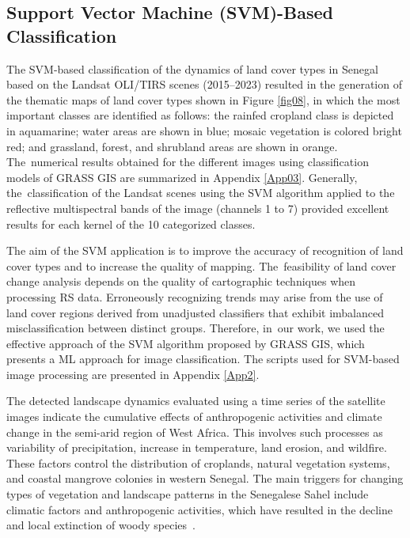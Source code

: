 \documentclass[earth,article,accept,pdftex,moreauthors]{Definitions/mdpi}
\begin{document}
{\subsection{{Support Vector Machine (SVM)-Based Classification}}

{The {SVM-based} classification of the dynamics of land cover types in Senegal based on the Landsat OLI/TIRS scenes (2015--2023) resulted in the generation of the thematic maps of land cover types  shown in Figure} \ref{fig08}, {in which the most important classes are identified as follows: the {rainfed} cropland class is depicted in aquamarine; water areas are shown in blue; mosaic vegetation is colored bright red; and grassland, forest, and shrubland areas are shown in orange. The~numerical results obtained for the different images using classification models of GRASS GIS are summarized in Appendix \ref{App03}. %
 Generally, the~classification of the Landsat {scenes} using{ }the SVM algorithm {applied to} the reflective multispectral bands of the image (channels 1 to 7) provided excellent results for each kernel of the 10 categorized classes.} 

{The aim of the SVM application{ }is to improve the accuracy of recognition of land cover types and {to }increase the quality of{ }mapping. The~feasibility of land cover change analysis depends on the quality of {cartographic techniques} when processing {RS} data. Erroneously recognizing trends may arise from the use of land cover regions derived from unadjusted classifiers that exhibit imbalanced misclassification between distinct groups. Therefore, in~our work, we used the {effective} approach of the {SVM} algorithm proposed by  GRASS GIS, which presents a {ML} approach for image classification. {The} scripts used for SVM-based image processing are presented in Appendix} \ref{App2}.

{The} detected {landscape dynamics evaluated using a time series of the satellite images indicate the cumulative effects of anthropogenic activities and }climate change {in the} semi-arid region of West Africa. {This involves such processes as }variability of precipitation, increase in temperature, land erosion, and wildfire. These factors control the distribution of croplands, natural vegetation systems, and coastal mangrove colonies in western Senegal. {The} main triggers for changing types of vegetation and landscape patterns in the Senegalese Sahel{ }include{ }climatic factors and anthropogenic activities, which have resulted in the decline and local extinction of woody species~\cite{land3030770}. 

}
\end{document}
